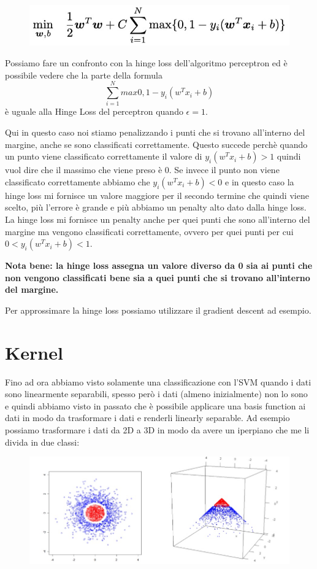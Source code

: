 \documentclass[14pt]{extreport}
\begin{document}
\begin{figure}[H]
	\centering
	\includegraphics[width=0.7\linewidth]{328.jpeg}
\end{figure}

Possiamo fare un confronto con la hinge loss dell'algoritmo perceptron ed è possibile vedere che la parte della formula $$\sum_{i=1}^N max{0,
			1-y_i(w^Tx_i+b)}$$ è uguale alla Hinge Loss del perceptron quando $\epsilon = 1$.

Qui in questo caso noi stiamo penalizzando i punti che si trovano all'interno del margine, anche se sono classificati correttamente. Questo succede
perchè quando un punto viene classificato correttamente il valore di $y_i(w^Tx_i+b) > 1$ quindi vuol dire che il massimo che viene preso è 0. Se
invece il punto non viene classificato correttamente abbiamo che $y_i(w^Tx_i+b)<0$ e in questo caso la hinge loss mi fornisce un valore maggiore per
il secondo termine che quindi viene scelto, più l'errore è grande e più abbiamo un penalty alto dato dalla hinge loss. La hinge loss mi fornisce un
penalty anche per quei punti che sono all'interno del margine ma vengono classificati correttamente, ovvero per quei punti per cui
$0<y_i(w^Tx_i+b)<1$.

\textbf{Nota bene: la hinge loss assegna un valore diverso da 0 sia ai punti che non vengono classificati bene sia a quei punti che si trovano all'interno del margine.}

Per approssimare la hinge loss possiamo utilizzare il gradient descent ad esempio.

\section{Kernel}

Fino ad ora abbiamo visto solamente una classificazione con l'SVM quando i dati sono linearmente separabili, spesso però i dati (almeno inizialmente)
non lo sono e quindi abbiamo visto in passato che è possibile applicare una basis function ai dati in modo da trasformare i dati e renderli linearly
separable. Ad esempio possiamo trasformare i dati da 2D a 3D in modo da avere un iperpiano che me li divida in due classi:

\begin{figure}[H]
	\centering
	\includegraphics[width=0.5\linewidth]{332.jpeg}
\end{figure}
\end{document}
